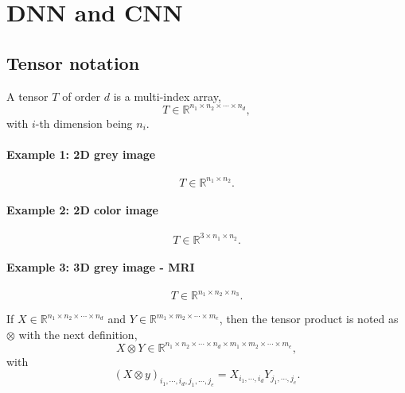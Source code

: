 \section{DNN and CNN}
\subsection{Tensor notation}
\begin{definition}
A tensor $T$ of order $d$  is a multi-index array,
\begin{equation}
T \in \mathbb R^{n_1 \times n_2 \times \cdots \times n_d},
\end{equation}
with $i$-th dimension being $n_i$.
\end{definition}
\paragraph{Example 1: 2D grey image}
\begin{equation}\label{2DGreyImage}
T \in \mathbb{R}^{n_1 \times n_2}.
\end{equation}
\paragraph{Example 2: 2D color image}
\begin{equation}\label{2DColorImage}
T \in \mathbb{R}^{3 \times n_1 \times n_2}.
\end{equation}
\paragraph{Example 3: 3D grey image - MRI}
\begin{equation}\label{3DColorImage}
T \in \mathbb{R}^{ n_1 \times n_2 \times n_3}.
\end{equation}

\begin{definition}
If $X \in \mathbb R^{n_1 \times n_2 \times \cdots \times n_d}$ and $Y \in \mathbb R^{m_1 \times m_2 \times \cdots \times m_e}$, then the tensor product is noted as $\otimes$ with the next definition,
\begin{equation}
X \otimes Y \in \mathbb R^{n_1 \times n_2 \times \cdots \times n_d \times m_1 \times m_2 \times \cdots \times m_e},
\end{equation}
with
\begin{equation}
(X\otimes y)_{i_1, \cdots, i_d, j_1, \cdots,j_e} = X_{i_1, \cdots, i_d} Y_{j_1, \cdots, j_e}.
\end{equation}
\end{definition}
